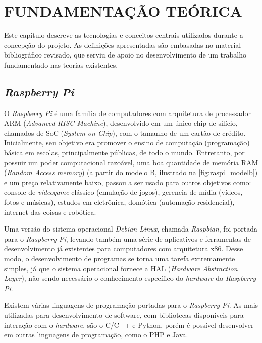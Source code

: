 
\chapter{FUNDAMENTAÇÃO TEÓRICA}
\label{chap:fundamentacao-teorica}

Este capítulo descreve as tecnologias e conceitos centrais utilizados durante a concepção do projeto. As definições apresentadas são embasadas no material bibliográfico revisado, que serviu de apoio no desenvolvimento de um trabalho fundamentado nas teorias existentes.

\section{\textit{Raspberry Pi}}
\label{sec:raspi}

O \textit{Raspberry Pi} é uma família de computadores com arquitetura de processador ARM (\textit{Advanced RISC Machine}), desenvolvido em um único chip de silício, chamados de SoC (\textit{System on Chip}), com o tamanho de um cartão de crédito. Inicialmente, seu objetivo era promover o ensino de computação (programação) básica em escolas, principalmente públicas, de todo o mundo. Entretanto, por possuir um poder computacional razoável, uma boa quantidade de memória RAM (\textit{Random Access memory}) (a partir do modelo B, ilustrado na \autoref{fig:raspi_modelb}) e um preço relativamente baixo, passou a ser usado para outros objetivos como: console de \textit{videogame} clássico (emulação de jogos), gerencia de mídia (vídeos, fotos e músicas), estudos em eletrônica, domótica (automação residencial), internet das coisas e robótica.  \par
Uma versão do sistema operacional \textit{Debian Linux}, chamada \textit{Raspbian}, foi portada para o \textit{Raspberry Pi}, levando também uma série de aplicativos e ferramentas de desenvolvimento já existentes para computadores com arquitetura x86. Desse modo, o desenvolvimento de programas se torna uma tarefa extremamente simples, já que o sistema operacional fornece a HAL (\textit{Hardware Abstraction Layer}), não sendo necessário o conhecimento específico do \textit{hardware} do \textit{Raspberry Pi}. \par
Existem várias linguagens de programação portadas para o \textit{Raspberry Pi}. As mais utilizadas para desenvolvimento de software, com bibliotecas disponíveis para interação com o \textit{hardware}, são o C/C++ e Python, porém é possível desenvolver em outras linguagens de programação, como o PHP e Java.  \par

